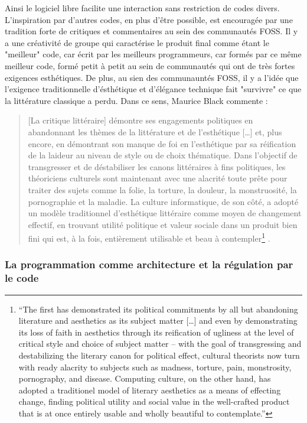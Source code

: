 Ainsi le logiciel libre facilite une interaction sans restriction de codes divers. L'inspiration par d'autres codes, en plus d'être possible, est encouragée par une tradition forte de critiques et commentaires au sein des communautés FOSS. Il y a une créativité de groupe qui caractérise le produit final comme étant le "meilleur" code, car écrit par les meilleurs programmeurs, car formés par ce même meilleur code, formé petit à petit au sein de communautés qui ont de très fortes exigences esthétiques. De plus, au sien des communauntés FOSS, il y a l'idée que l'exigence traditionnelle d'ésthétique et d'élégance technique fait "survivre" ce que la littérature classique a perdu. Dans ce sens, Maurice Black commente :

\begin{quote}
[La critique littéraire] démontre ses engagements politiques en abandonnant les thèmes de la littérature et de l'esthétique [\ldots] et, plus encore, en démontrant son manque de foi en l'esthétique par sa réification de la laideur au niveau de style ou de choix thématique. Dans l'objectif de transgresser et de déstabiliser les canons littéraires à fins politiques, les théoriciens culturels sont maintenant avec une alacrité toute prête pour traiter des sujets comme la folie, la torture, la douleur, la monstruosité, la pornographie et la maladie. La culture informatique, de son côté, a adopté un modèle traditionnel d'esthétique littéraire comme moyen de changement effectif, en trouvant utilité politique et valeur sociale dans un produit bien fini qui est, à la fois, entièrement utilisable et beau à contempler\footnote{“The first has demonstrated its political commitments by all but abandoning literature and aesthetics as its subject matter [\ldots] and even by demonstrating its loss of faith in aesthetics through its reification of ugliness at the level of critical style and choice of subject matter – with the goal of transgressing and destabilizing the literary canon for political effect, cultural theorists now turn with ready alacrity to subjects such as madness, torture, pain, monstrosity, pornography, and disease. Computing culture, on the other hand, has adopted a traditionel model of literary aesthetics as a means of effecting change, finding political utility and social value in the well-crafted product that is at once entirely usable and wholly beautiful to contemplate.”} \citep[p.20]{Black2002}.
\end{quote}

\subsubsection{La programmation comme architecture et la régulation par le code} \label{2.3.1.b}

